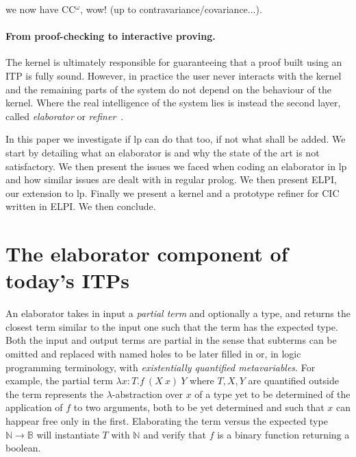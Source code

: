 \documentclass{easychair}
\begin{document}
we now have CC$^\omega$, wow!  (up to contravariance/covariance...).


\paragraph{From proof-checking to interactive proving.}

The kernel is ultimately responsible for guaranteeing that a proof
built using an ITP is fully sound. However, in practice the user never
interacts with the kernel and the remaining parts of the system do not
depend on the behaviour of the kernel. Where the real intelligence of
the system lies is instead the second layer, called \emph{elaborator}
or \emph{refiner}~\cite{??,??,??}.


In this paper we investigate if lp can do that too, if not
what shall be added.  We start by detailing what an elaborator is and
why the state of the art is not satisfactory.  We then present the
issues
we faced when coding an elaborator in lp and how similar issues are
dealt with in regular prolog.  We then present ELPI, our extension to
lp.  Finally we present a kernel and a prototype refiner for CIC
written in ELPI.  We then conclude.

\section{The elaborator component of today's ITPs}

An elaborator takes in input a \emph{partial term} and optionally a
type, and returns the closest term similar to the input one such that
the term has the expected type. Both the input and output terms are
partial in the sense that subterms can be omitted and replaced with
named holes to be later filled in or, in logic programming
terminology, with \emph{existentially quantified metavariables}. For
example, the partial term $\lambda x: T. f~(X~x)~Y$ where $T,X,Y$ are
quantified outside the term represents the $\lambda$-abstraction over
$x$ of a type yet to be determined of the application of $f$ to two
arguments, both to be yet determined and such that $x$ can happear
free only in the first. Elaborating the term versus the expected type
$\mathbb{N} \to \mathbb{B}$ will instantiate $T$ with $\mathbb{N}$ and
verify that $f$ is a binary function returning a boolean.
\end{document}
